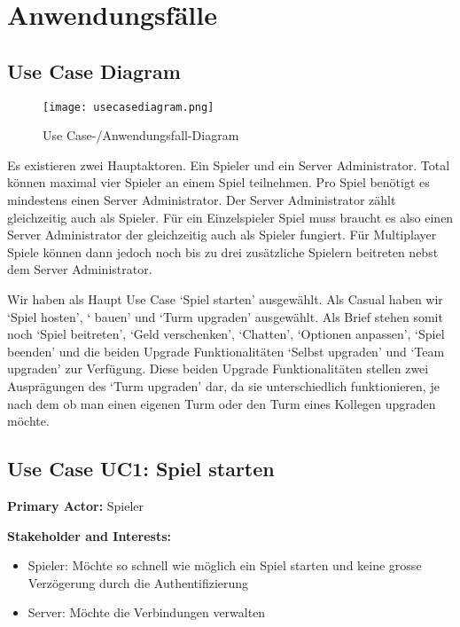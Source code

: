 \section{Anwendungsfälle}

\subsection{Use Case Diagram}

\begin{figure}[htb]
 \begin{center}
  \leavevmode
  \texttt{[image: usecasediagram.png]}
 \end{center}
 \caption{Use Case-/Anwendungsfall-Diagram}
 \label{fig:usecasediagram}
\end{figure}

Es existieren zwei Hauptaktoren. Ein Spieler und ein Server Administrator. Total können maximal vier Spieler an einem Spiel teilnehmen. Pro Spiel benötigt es mindestens einen Server Administrator. Der Server Administrator zählt gleichzeitig auch als Spieler. Für ein Einzelspieler Spiel muss braucht es also einen Server Administrator der gleichzeitig auch als Spieler fungiert. Für Multiplayer Spiele können dann jedoch noch bis zu drei zusätzliche Spielern beitreten nebst dem Server Administrator.

Wir haben als Haupt Use Case `Spiel starten' ausgewählt. Als Casual haben wir `Spiel hosten', ` bauen' und `Turm upgraden' ausgewählt. Als Brief stehen somit noch `Spiel beitreten', `Geld verschenken', `Chatten', `Optionen anpassen', `Spiel beenden' und die beiden Upgrade Funktionalitäten `Selbst upgraden' und `Team upgraden' zur Verfügung. Diese beiden Upgrade Funktionalitäten stellen zwei Ausprägungen des `Turm upgraden' dar, da sie unterschiedlich funktionieren, je nach dem ob man einen eigenen Turm oder den Turm eines Kollegen upgraden möchte.

\subsection{Use Case UC1: Spiel starten}

\textbf{Primary Actor:} Spieler

\textbf{Stakeholder and Interests:}

\begin{itemize}
\item Spieler: Möchte so schnell wie möglich ein Spiel starten und keine grosse Verzögerung durch die Authentifizierung
\item Server: Möchte die Verbindungen verwalten
\end{itemize}

